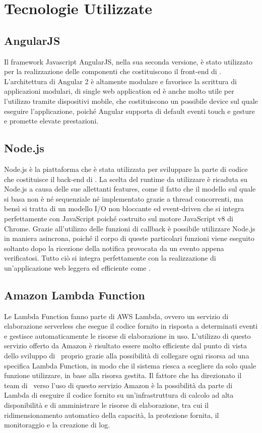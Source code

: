 \documentclass[../ManualeSviluppatore_v1.0.0.tex]{subfiles}
\begin{document}
\section{Tecnologie Utilizzate}

	\subsection{AngularJS}
		Il \gls{framework} Javascript AngularJS, nella sua seconda versione, è stato utilizzato per la realizzazione delle componenti che costituiscono il \gls{front-end} di \atavi. L'architettura di Angular 2 è altamente modulare e favorisce la scrittura di applicazioni modulari, di single web application ed è anche molto utile per l'utilizzo tramite dispositivi mobile, che costituiscono un possibile device sul quale eseguire l'applicazione, poiché Angular supporta di default eventi touch e gesture e promette elevate prestazioni.
	\subsection{Node.js}
		Node.js è la piattaforma che è stata utilizzata per sviluppare la parte di codice che costituisce il back-end di \atavi. La scelta del \gls{runtime} da utilizzare è ricaduta su Node.js a causa delle sue allettanti \gls{features}, come il fatto che il modello sul quale si basa non è né sequenziale né implementato grazie a \gls{thread} concorrenti, ma bensì si tratta di un \gls{modello I/O} non bloccante ed \gls{event-driven} che si integra perfettamente con JavaScript poiché costruito sul motore JavaScript v8 di Chrome. Grazie all'utilizzo delle \gls{funzioni di callback} è possibile utilizzare Node.js in maniera \gls{asincrona}, poiché il corpo di queste particolari funzioni viene eseguito soltanto dopo la ricezione della notifica provocata da un evento appena verificatosi. Tutto ciò si integra perfettamente con la realizzazione di un'applicazione web leggera ed efficiente come \atavi.
	\subsection{Amazon Lambda Function}
		Le Lambda Function fanno parte di AWS Lambda, ovvero un servizio di elaborazione \gls{serverless} che esegue il codice fornito in risposta a determinati eventi e gestisce automaticamente le risorse di elaborazione in uso. L'utilizzo di questo servizio offerto da Amazon è risultato essere molto efficiente dal punto di vista dello sviluppo di \atavi\ proprio grazie alla possibilità di collegare ogni risorsa ad una specifica Lambda Function, in modo che il sistema riesca a scegliere da solo quale funzione utilizzare, in base alla risorsa gestita. Il fattore che ha direzionato il team di \kpanic\ verso l'uso di questo servizio Amazon è la possibilità da parte di Lambda di eseguire il codice fornito su un'infrastruttura di calcolo ad alta disponibilità e di amministrare le risorse di elaborazione, tra cui il ridimensionamento automatico della capacità, la protezione fornita, il monitoraggio e la creazione di log.
\end{document}
